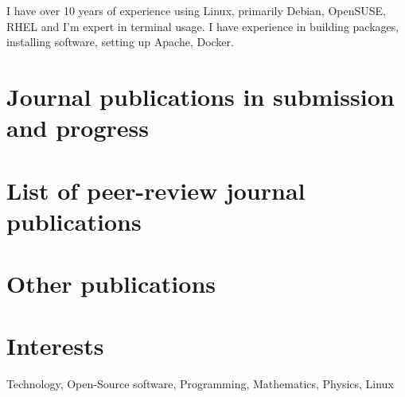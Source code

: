 \documentclass[a4paper,10pt]{article} %
\begin{document}
{I have over 10 years of experience using Linux, primarily Debian, OpenSUSE, RHEL and I'm expert in terminal usage.
I have experience in building packages, installing software, setting up Apache, Docker.

\section{Journal publications in submission and progress}






\section{List of peer-review journal publications}




\section{Other publications}








\section{Interests}

Technology, Open-Source software, Programming, Mathematics, Physics, Linux


}
\end{document}
